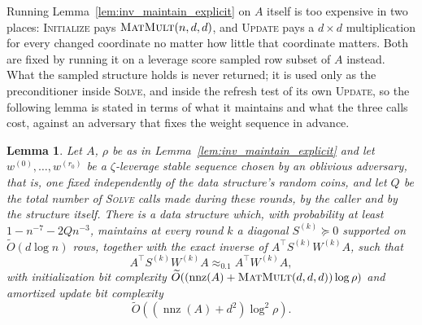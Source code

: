 \documentclass[11pt]{article}
\newtheorem{lemma}{Lemma}[section]
\newcommand{\nnz}{\operatorname{nnz}}
\newcommand{\MM}{\textsc{MatMult}}
\renewcommand{\O}{\widetilde O}
\begin{document}
Running Lemma~\ref{lem:inv_maintain_explicit} on $A$ itself is too expensive in
two places: \textsc{Initialize} pays $\MM(n, d, d)$, and \textsc{Update} pays a
$d \times d$ multiplication for every changed coordinate no matter how little
that coordinate matters.
Both are fixed by running it on a leverage score sampled row subset of $A$
instead.
What the sampled structure holds is never returned; it is used only as the
preconditioner inside \textsc{Solve}, and inside the refresh test of its own
\textsc{Update}, so the following lemma is stated in terms of what it maintains
and what the three calls cost, against an adversary that fixes the weight
sequence in advance.

\begin{lemma}
\label{lem:sampled_maintain}
Let $A$,
$\rho$ be as in Lemma~\ref{lem:inv_maintain_explicit} and let
$w^{(0)}, \ldots, w^{(r_0)}$ be a
$\zeta$-leverage stable sequence chosen by an oblivious adversary, that is, one
fixed independently of the data structure's random coins, and let $Q$ be the
total number of \textsc{Solve} calls made during these rounds, by the caller and
by the structure itself.
There is a data structure which, with probability at least
$1 - n^{-7} - 2 Q n^{-3}$, maintains at every round
$k$ a diagonal
$S^{(k)} \succeq 0$ supported on
$\O(d \log n)$ rows, together with the exact inverse of
$A^\top S^{(k)} W^{(k)} A$, such that
\begin{equation}
\label{eq:sample_spectral}
A^\top S^{(k)} W^{(k)} A
\approx_{0.1}
A^\top W^{(k)} A ,
\end{equation}
with initialization bit complexity $\O( ( \nnz(A) + \MM(d, d, d) ) \log \rho )$
and amortized update bit complexity
\[
\O\left( \left( \nnz(A) + d^{2} \right) \log^{2} \rho \right) .
\]
\end{lemma}
\end{document}
